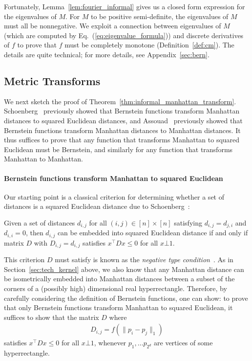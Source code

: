 Fortunately, Lemma~\ref{lem:fourier_informal} gives us a closed form expression for the eigenvalues of $M$. For $M$ to be positive semi-definite, the eigenvalues of $M$ must all be nonnegative. We exploit a connection between eigenvalues of $M$ (which are computed by Eq.~(\ref{eq:eigenvalue_formula})) and discrete derivatives of $f$ to prove that $f$ must be completely monotone (Definition~\ref{def:cm}). The details are quite technical; for more details, see Appendix~\ref{sec:bern}. 
\subsection{Metric Transforms}

We next sketch the proof of Theorem~\ref{thm:informal_manhattan_transform}. Schoenberg~\cite{s38} previously showed that Bernstein functions transform Manhattan distances to squared Euclidean distances, and Assouad~\cite{a80} previously showed that Bernstein functions transform Manhattan distances to Manhattan distances. It thus suffices to prove that any function that transforms Manhattan to squared Euclidean must be Bernstein, and similarly for any function that transforms Manhattan to Manhattan.


\paragraph{Bernstein functions transform Manhattan to squared Euclidean}
Our starting point is a classical criterion for determining whether a set of distances is a squared Euclidean distance due to Schoenberg~\cite{s35}:

\begin{lemma} 
Given a set of distances $d_{i,j}$ for all $(i,j) \in [n] \times [n]$ satisfying $d_{i,j} = d_{j,i}$ and $d_{i,i} = 0$, then $d_{i,j}$ can be embedded into squared Euclidean distance if and only if matrix $D$ with $D_{i,j} = d_{i,j}$ satisfies $x^{\top} D x \leq 0$ for all $x \bot 1$.
\end{lemma}
This criterion $D$ must satisfy is known as the \emph{negative type condition}~\cite{dl09}. As in Section~\ref{sec:tech_kernel} above, we also know that any Manhattan distance can be isometrically embedded into Manhattan distances between a subset of the corners of a (possibly high) dimensional real hyperrectangle. Therefore, by carefully considering the definition of Bernstein functions, one can show: to prove that only Bernstein functions transform Manhattan to squared Euclidean, it suffices to show that the matrix $D$ where
 \begin{align*}
  D_{i,j} = f(\|p_i - p_j\|_1) 
 \end{align*}
 satisfies $x^{\top} D x \leq 0 $ for all $x \bot 1$, whenever $p_1, \ldots p_{2^d}$ are vertices of some hyperrectangle. 
 
